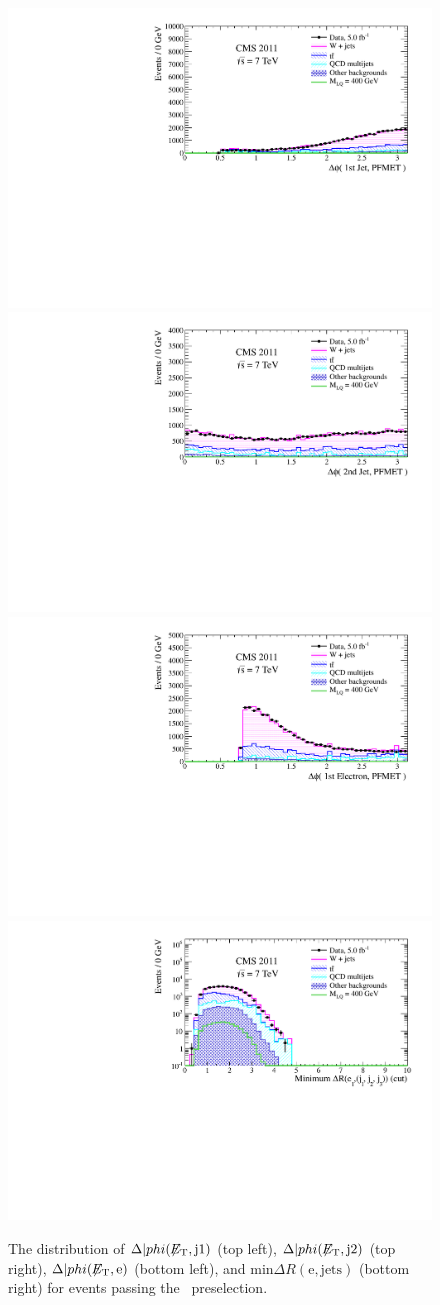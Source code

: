 \begin{figure}[htbp]
  \begin{center}
    {\includegraphics[width=.45\textwidth]{tex/analysis/event_selection/fig/enu/preselection/mDPhi1stJetMET_PAS_enujj_WZSherpa_noNSigma.pdf}}
    {\includegraphics[width=.45\textwidth]{tex/analysis/event_selection/fig/enu/preselection/mDPhi2ndJetMET_PAS_enujj_WZSherpa_noNSigma.pdf}} \\
    {\includegraphics[width=.45\textwidth]{tex/analysis/event_selection/fig/enu/preselection/mDPhi1stEleMET_PAS_enujj_WZSherpa_noNSigma.pdf}}
    {\includegraphics[width=.45\textwidth]{tex/analysis/event_selection/fig/enu/preselection/minDR_EleJet_PAS_enujj_WZSherpa_noNSigma.pdf}}
    \caption{
      The distribution of 
      $\Delta|phi(\not\!\!{E_{\text{T}}},\text{j1})$ (top left), 
      $\Delta|phi(\not\!\!{E_{\text{T}}},\text{j2})$ (top right),
      $\Delta|phi(\not\!\!{E_{\text{T}}},\text{e})$  (bottom left), and 
      $\text{min}\Delta R (\text{e},\text{jets})$ (bottom right)
      for events passing the \enujj~preselection.
    }
    \label{fig:enujj_preselection_deltaPhi}
  \end{center}
\end{figure}


